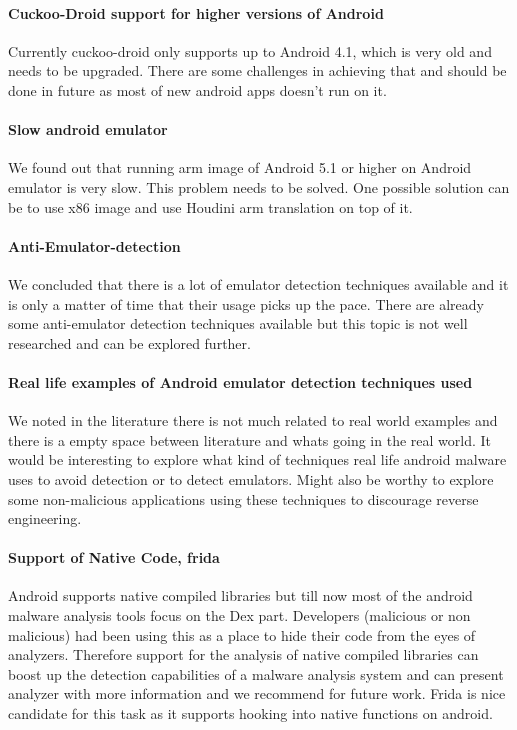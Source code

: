 \documentclass[../main.tex]{subfile}
\begin{document}
\paragraph{Cuckoo-Droid support for higher versions of Android} Currently cuckoo-droid only supports up to Android 4.1, which is very old and needs to be upgraded. There are some challenges in achieving that and should be done in future as most of new android apps doesn't run on it.
\paragraph{Slow android emulator} We found out that running arm image of Android 5.1 or higher on Android emulator is very slow. This problem needs to be solved. One possible solution can be to use x86 image and use Houdini arm translation on top of it.
\paragraph{Anti-Emulator-detection} We concluded that there is a lot of emulator detection techniques available and it is only a matter of time that their usage picks up the pace. There are already some anti-emulator detection techniques available but this topic is not well researched and can be explored further.
\paragraph{Real life examples of Android emulator detection techniques used} We noted in the literature there is not much related to real world examples and there is a empty space between literature and whats going in the real world. It would be interesting to explore what kind of techniques real life android malware uses to avoid detection or to detect emulators. Might also be worthy to explore some non-malicious applications using these techniques to discourage reverse engineering.
\paragraph{Support of Native Code, frida} Android supports native compiled libraries but till now most of the android malware analysis tools focus on the Dex part. Developers (malicious or non malicious) had been using this as a place to hide their code from the eyes of analyzers. Therefore support for the analysis of native compiled libraries can boost up the detection capabilities of a malware analysis system and can present analyzer with more information and we recommend for future work. Frida is nice candidate for this task as it supports hooking into native functions on android.
\end{document}
